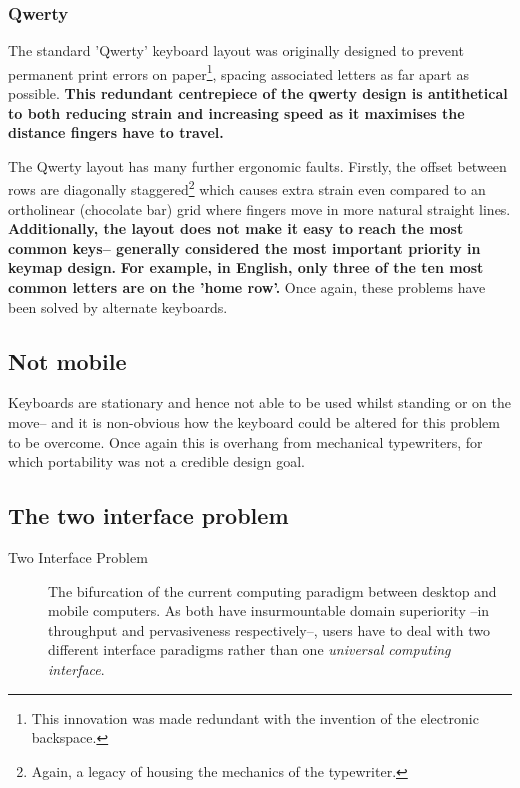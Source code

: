 \documentclass[logo,bsc,singlespacing,parskip]{infthesis}
\begin{document}
\subsubsection{Qwerty}
\label{sec:org2ac33e7}
The standard 'Qwerty' keyboard layout was originally designed to prevent permanent print errors on paper\footnote{This innovation was made redundant with the invention of the electronic backspace.}, spacing associated letters as far apart as possible.
\textbf{This redundant centrepiece of the qwerty design is antithetical to both reducing strain and increasing speed as it maximises the distance fingers have to travel.}

The Qwerty layout has many further ergonomic faults.
Firstly, the offset between rows are diagonally staggered\footnote{Again, a legacy of housing the mechanics of the typewriter.} which causes extra strain even compared to an ortholinear (chocolate bar) grid where fingers move in more natural straight lines.
\textbf{Additionally, the layout does not make it easy to reach the most common keys-- generally considered the most important priority in keymap design.}
\textbf{For example, in English, only three of the ten most common letters are on the 'home row'.}
Once again, these problems have been solved by alternate keyboards.
\subsection{Not mobile}
\label{sec:org0e3624d}
Keyboards are stationary and hence not able to be used whilst standing or on the move-- and it is non-obvious how the keyboard could be altered for this problem to be overcome.
Once again this is overhang from mechanical typewriters, for which portability was not a credible design goal.

\subsection{The two interface problem}
\label{sec:org44f0cbf}
\medskip
\begin{mdframed}
\begin{description}
\item[{Two Interface Problem\label{two interface problem}}] The bifurcation of the current computing paradigm between desktop and mobile computers.
As both have insurmountable domain superiority --in throughput and pervasiveness respectively--, users have to deal with two different interface paradigms rather than one \emph{universal computing interface}.
\end{description}
\end{mdframed}
\end{document}

